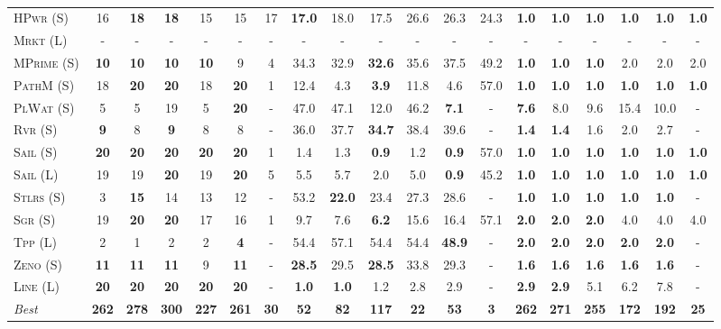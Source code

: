 \documentclass[11pt,landscape]{article}
\begin{document}
\begin{table*}[tb]
{\begin{tabular}{|l||cccccc||cccccc||cccccc||}
\textsc{HPwr} (S)&16&\textbf{18}&\textbf{18}&15&15&17&\textbf{17.0}&18.0&17.5&26.6&26.3&24.3&\textbf{1.0}&\textbf{1.0}&\textbf{1.0}&\textbf{1.0}&\textbf{1.0}&\textbf{1.0}\\
\textsc{Mrkt} (L)&-&-&-&-&-&-&-&-&-&-&-&-&-&-&-&-&-&-\\
\textsc{MPrime} (S)&\textbf{10}&\textbf{10}&\textbf{10}&\textbf{10}&9&4&34.3&32.9&\textbf{32.6}&35.6&37.5&49.2&\textbf{1.0}&\textbf{1.0}&\textbf{1.0}&2.0&2.0&2.0\\
\textsc{PathM} (S)&18&\textbf{20}&\textbf{20}&18&\textbf{20}&1&12.4&4.3&\textbf{3.9}&11.8&4.6&57.0&\textbf{1.0}&\textbf{1.0}&\textbf{1.0}&\textbf{1.0}&\textbf{1.0}&\textbf{1.0}\\
\textsc{PlWat} (S)&5&5&19&5&\textbf{20}&-&47.0&47.1&12.0&46.2&\textbf{7.1}&-&\textbf{7.6}&8.0&9.6&15.4&10.0&-\\
\textsc{Rvr} (S)&\textbf{9}&8&\textbf{9}&8&8&-&36.0&37.7&\textbf{34.7}&38.4&39.6&-&\textbf{1.4}&\textbf{1.4}&1.6&2.0&2.7&-\\
\textsc{Sail} (S)&\textbf{20}&\textbf{20}&\textbf{20}&\textbf{20}&\textbf{20}&1&1.4&1.3&\textbf{0.9}&1.2&\textbf{0.9}&57.0&\textbf{1.0}&\textbf{1.0}&\textbf{1.0}&\textbf{1.0}&\textbf{1.0}&\textbf{1.0}\\
\textsc{Sail} (L)&19&19&\textbf{20}&19&\textbf{20}&5&5.5&5.7&2.0&5.0&\textbf{0.9}&45.2&\textbf{1.0}&\textbf{1.0}&\textbf{1.0}&\textbf{1.0}&\textbf{1.0}&\textbf{1.0}\\
\textsc{Stlrs} (S)&3&\textbf{15}&14&13&12&-&53.2&\textbf{22.0}&23.4&27.3&28.6&-&\textbf{1.0}&\textbf{1.0}&\textbf{1.0}&\textbf{1.0}&\textbf{1.0}&-\\
\textsc{Sgr} (S)&19&\textbf{20}&\textbf{20}&17&16&1&9.7&7.6&\textbf{6.2}&15.6&16.4&57.1&\textbf{2.0}&\textbf{2.0}&\textbf{2.0}&4.0&4.0&4.0\\
\textsc{Tpp} (L)&2&1&2&2&\textbf{4}&-&54.4&57.1&54.4&54.4&\textbf{48.9}&-&\textbf{2.0}&\textbf{2.0}&\textbf{2.0}&\textbf{2.0}&\textbf{2.0}&-\\
\textsc{Zeno} (S)&\textbf{11}&\textbf{11}&\textbf{11}&9&\textbf{11}&-&\textbf{28.5}&29.5&\textbf{28.5}&33.8&29.3&-&\textbf{1.6}&\textbf{1.6}&\textbf{1.6}&\textbf{1.6}&\textbf{1.6}&-\\
\textsc{Line} (L)&\textbf{20}&\textbf{20}&\textbf{20}&\textbf{20}&\textbf{20}&-&\textbf{1.0}&\textbf{1.0}&1.2&2.8&2.9&-&\textbf{2.9}&\textbf{2.9}&5.1&6.2&7.8&-
\\\hline
\textit{Best}&\textbf{262}&\textbf{278}&\textbf{300}&\textbf{227}&\textbf{261}&\textbf{30}&\textbf{52}&\textbf{82}&\textbf{117}&\textbf{22}&\textbf{53}&\textbf{3}&\textbf{262}&\textbf{271}&\textbf{255}&\textbf{172}&\textbf{192}&\textbf{25}\\\hline

        \end{tabular}}
        \caption{}
        \label{tab:all-patty}
        \end{table*}
        
\end{document}
